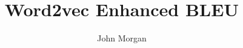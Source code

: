 \documentclass[final]{beamer}
\title[Word2vec BLEU]{Word2vec Enhanced BLEU}
\author[Morgan]{John Morgan}
\institute[UMD]{University of Maryland}
\date{}
\begin{document}
\begin{frame}{}
\vfill
\begin{beamercolorbox}{}
\maketitle
\end{beamercolorbox}
  \vskip -1.1in
\begin{columns}[t]
\begin{column}{.32\linewidth}

\end{column}
\begin{column}{.33\linewidth}
\end{column}
\begin{column}{.35\linewidth}
\end{column}
\end{columns}
\end{frame}
\end{document}

